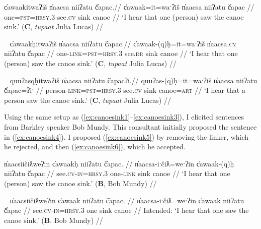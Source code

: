 \ex \label{ex:canoesink1}
\begingl
\glpreamble c̓awaakitwaʔiš n̓aacsa niiʔatu č̓apac.//
\gla c̓awaak=it=waˑʔiš n̓aacsa niiʔatu č̓apac //
\glb one=\textsc{pst}=\textsc{hrsy.3} see.\textsc{cv} sink canoe //
\glft `I hear that one (person) saw the canoe sink.' (\textbf{C}, \textit{tupaat} Julia Lucas) //
\endgl
\xe

\ex~ \label{ex:canoesink2}
\begingl
\glpreamble c̓awaakḥitwaʔiš n̓aacsa niiʔatu č̓apac.//
\gla c̓awaak-(q)ḥ=it=waˑʔiš n̓aacsa.\textsc{cv} niiʔatu č̓apac //
\glb one-\textsc{link}=\textsc{pst}=\textsc{hrsy.3} see.\textsc{dr} sink canoe //
\glft `I hear that one (person) saw the canoe sink.' (\textbf{C}, \textit{tupaat} Julia Lucas) //
\endgl
\xe

\ex~ \label{ex:canoesink3}
\begingl
\glpreamble quuʔasqḥitwaʔiš n̓aacsa niiʔatu č̓apacʔi.//
\gla quuʔas-(q)ḥ=it=waˑʔiš n̓aacsa niiʔatu č̓apac=ʔiˑ //
\glb person-\textsc{link}=\textsc{pst}=\textsc{hrsy.3} see.\textsc{cv} sink canoe=\textsc{art} //
\glft `I hear that a person saw the canoe sink.' (\textbf{C}, \textit{tupaat} Julia Lucas) //
\endgl
\xe


Using the same setup as (\ref{ex:canoesink1}--\ref{ex:canoesink3}), I elicited sentences from Barkley speaker Bob Mundy. This consultant initially proposed the sentence in (\ref{ex:canoesink4}). I proposed (\ref{ex:canoesink5}) by removing the linker, which he rejected, and then (\ref{ex:canoesink6}), which he accepted.

\ex \label{ex:canoesink4}
\begingl
\glpreamble n̓aacsiičiƛweʔin c̓awaakḥ niiʔatu č̓apac. //
\gla n̓aacsa-iˑčiƛ=weˑʔin c̓awaak-(q)ḥ niiʔatu č̓apac //
\glb see.\textsc{cv}-\textsc{in}=\textsc{hrsy.3} one-\textsc{link} sink canoe //
\glft `I hear that one (person) saw the canoe sink.' (\textbf{B}, Bob Mundy) //
\endgl
\xe

\ex~ \label{ex:canoesink5}
\begingl
\glpreamble *n̓aacsiičiƛweʔin c̓awaak niiʔatu č̓apac. //
\gla n̓aacsa-iˑčiƛ=weˑʔin c̓awaak niiʔatu č̓apac //
\glb see.\textsc{cv}-\textsc{in}=\textsc{hrsy.3} one sink canoe //
\glft Intended: `I hear that one saw the canoe sink.' (\textbf{B}, Bob Mundy) //
\endgl
\xe

